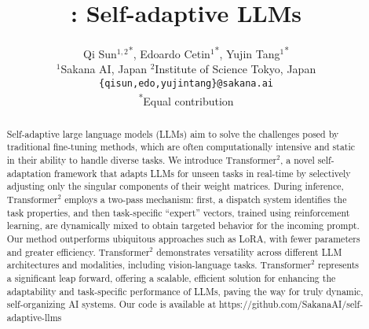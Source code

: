\documentclass{article} %
\title{\implname: Self-adaptive LLMs}
\author{
Qi Sun$^{1,2}$\textsuperscript{*}, Edoardo Cetin$^{1}$\textsuperscript{*}, Yujin Tang$^{1}$\textsuperscript{*} \\
$^1$Sakana AI, Japan \quad $^2$Institute of Science Tokyo, Japan \\
\texttt{\{qisun,edo,yujintang\}@sakana.ai} \\
\textsuperscript{*}Equal contribution
}
\newcommand{\implname}{$\text{Transformer}^2$\xspace}
\begin{document}
% 

\maketitle

\begin{abstract}
Self-adaptive large language models (LLMs) aim to solve the challenges posed by traditional fine-tuning methods, which are often computationally intensive and static in their ability to handle diverse tasks.
We introduce \implname, a novel self-adaptation framework that adapts LLMs for unseen tasks in real-time by selectively adjusting only the singular components of their weight matrices. 
During inference, \implname employs a two-pass mechanism: first, a dispatch system identifies the task properties, and then task-specific ``expert'' vectors, trained using reinforcement learning, are dynamically mixed to obtain targeted behavior for the incoming prompt.  
Our method outperforms ubiquitous approaches such as LoRA, with fewer parameters and greater efficiency. \implname demonstrates versatility across different LLM architectures and modalities, including vision-language tasks.
\implname represents a significant leap forward, offering a scalable, efficient solution for enhancing the adaptability and task-specific performance of LLMs, paving the way for truly dynamic, self-organizing AI systems. 
Our code is available at https://github.com/SakanaAI/self-adaptive-llms


\end{abstract}











\newpage

\end{document}
